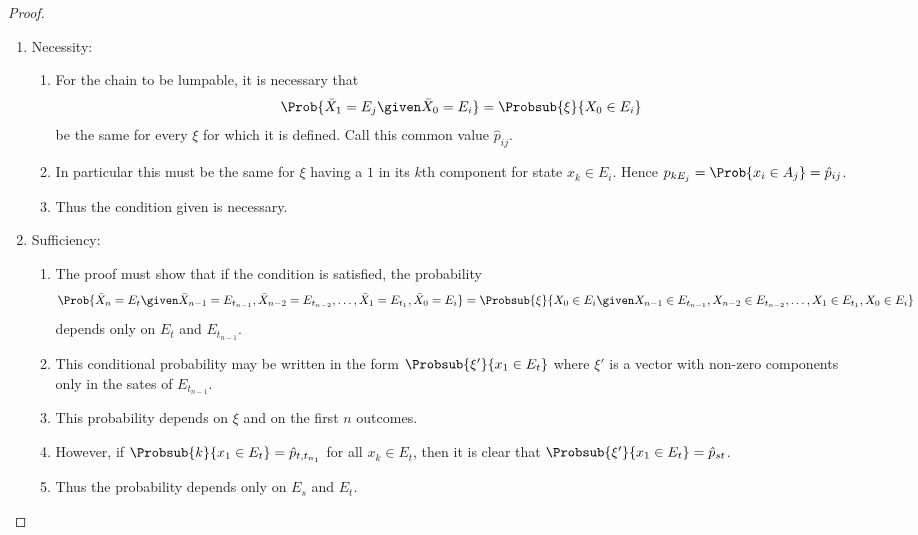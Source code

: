 \documentclass[12pt]{article}
\begin{document}
\begin{proof}
    \begin{enumerate}
        \item
            Necessity:
            \begin{enumerate}
                \item
                    For the chain to be lumpable, it is necessary that
                    \[
                        \Prob{\bar{X}_1 = E_j \given \bar{X}_0 = E_i} =
                        \Probsub{\xi}{X_0 \in E_i }
                    \] be the same for every \( \xi \) for which it is
                    defined.  Call this common value \( \hat{p}_{ij} \).
                \item
                    In particular this must be the same for \( \xi \)
                    having a \( 1 \) in its \( k \)th component for
                    state \( x_k \in E_i \). Hence \( p_{kE_j} = \Prob{x_i
                    \in A_j} = \hat{p}_{ij} \).
                \item
                    Thus the condition given is necessary.
            \end{enumerate}
        \item
            Sufficiency:
            \begin{enumerate}
                \item
                    The proof must show that if the condition is
                    satisfied, the probability
                    \[
                        \Prob{\bar{X}_n = E_t \given \bar{X}_{n-1} = E_{t_
                        {n-1}}, \bar{X}_{n-2} = E_{t_{n-2}}, \dots, \bar
                        {X}_1 = E_{t_1}, \bar{X}_0 = E_i} = \Probsub{\xi}
                        {X_0 \in E_i \given X_{n-1} \in E_{t_{n-1}}, X_{n-2}
                        \in E_{t_{n-2}}, \dots, X_1 \in E_{t_1}, X_0 \in
                        E_i}
                    \] depends only on \( E_t \) and \( E_{t_{n-1}} \).
                \item
                    This conditional probability may be written in the
                    form \( \Probsub{\xi'}{x_1 \in E_t} \) where \( \xi'
                    \) is a vector with non-zero components only in the
                    sates of \( E_{t_{n-1}} \).
                \item
                    This probability depends on \( \xi \) and on the
                    first \( n \) outcomes.
                \item
                    However, if \( \Probsub{k}{x_1 \in E_t} = \hat{p}_{t,
                    t_{n_1}} \) for all \( x_k \in E_t \), then it is
                    clear that \( \Probsub{\xi'}{x_1 \in E_t} = \hat{p}_
                    {st} \).
                \item
                    Thus the probability depends only on \( E_s \) and \(
                    E_t \).
            \end{enumerate}
    \end{enumerate}
\end{proof}
\end{document}
